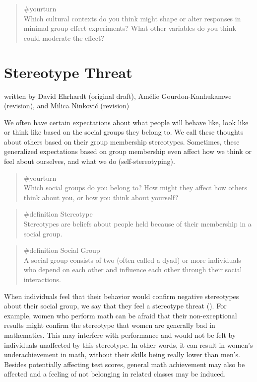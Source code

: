 \documentclass[
  letterpaper,
]{book}
\begin{document}
\begin{quote}
{\#yourturn}\\
Which cultural contexts do you think might shape or alter responses in
minimal group effect experiments? What other variables do you think
could moderate the effect?
\end{quote}


\chapter{\texorpdfstring{{Stereotype
Threat}}{Stereotype Threat}}\label{stereotype-threat}

{written by David Ehrhardt (original draft), Amélie Gourdon-Kanhukamwe
(revision), and Milica Ninković (revision)}

We often have certain expectations about what people will behave like,
look like or think like based on the social groups they belong to. We
call these thoughts about others based on their group membership
stereotypes. Sometimes, these generalized expectations based on group
membership even affect how we think or feel about ourselves, and what we
do (self-stereotyping).

\begin{quote}
{\#yourturn}\\
Which social groups do you belong to? How might they affect how others
think about you, or how you think about yourself?
\end{quote}

\begin{quote}
\label{def-stereotype}{\#definition} Stereotype\\
Stereotypes are beliefs about people held because of their membership in
a social group.
\end{quote}

\begin{quote}
\label{def-socialgroup}{\#definition} Social Group\\
A social group consists of two (often called a dyad) or more individuals
who depend on each other and influence each other through their social
interactions.
\end{quote}

When individuals feel that their behavior would confirm negative
stereotypes about their social group, we say that they feel a stereotype
threat ().
For example, women who perform math can be afraid that their
non-exceptional results might confirm the stereotype that women are
generally bad in mathematics. This may interfere with performance and
would not be felt by individuals unaffected by this stereotype. In other
words, it can result in women's underachievement in math, without their
skills being really lower than men's. Besides potentially affecting test
scores, general math achievement may also be affected and a feeling of
not belonging in related classes may be induced.
\end{document}
